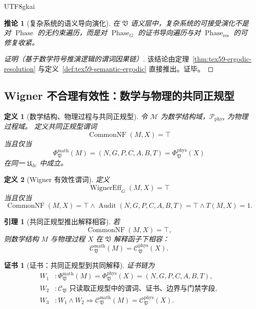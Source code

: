 \documentclass[12pt]{article}
\newtheorem{definition}{定义}[section]
\newtheorem{corollary}{推论}[section]
\newtheorem{lemma}{引理}[section]
\newtheorem{Certificate}{证书}[section]
\newcommand{\Udc}{\mathfrak{U}_{\mathrm{dc}}}
\newcommand{\Vsys}{\mathfrak V}
\DeclareMathOperator{\Audit}{Audit}
\DeclareMathOperator{\Phase}{Phase}
\DeclareMathOperator{\WignerEff}{WignerEff}
\DeclareMathOperator{\CommonNF}{CommonNF}
\begin{document}
\begin{CJK*}{UTF8}{gkai}
\begin{corollary}[复杂系统的语义导向演化]
\label{cor:tex59-semantic-directed-evolution}
在 \(\Vsys\) 语义层中，复杂系统的可接受演化不是对 \(\Phase\) 的无约束遍历，而是对
\(\Phase_G\) 的证书导向遍历与对 \(\Phase_{\mathrm{res}}\) 的可修复收紧。
\end{corollary}

\begin{proof}[证明（基于数学符号推演逻辑的谓词因果链）]
该结论由定理~\ref{thm:tex59-ergodic-resolution} 与定义~\ref{def:tex59-semantic-ergodic} 直接推出。证毕。
\end{proof}

\subsection{Wigner 不合理有效性：数学与物理的共同正规型}
\label{subsec:tex59-wigner-effectiveness}

\begin{definition}[数学结构、物理过程与共同正规型]
\label{def:tex59-wigner-common-nf}
令 \(\mathcal M\) 为数学结构域，\(\mathcal P_{\mathrm{phys}}\) 为物理过程域。
定义共同正规型谓词
\[
  \CommonNF(M,X)=\top
\]
当且仅当
\[
  \Phi_{\Vsys}^{\mathrm{math}}(M)
  =
  (N,G,P,C,A,B,T)
  =
  \Phi_{\Vsys}^{\mathrm{phys}}(X)
\]
在同一 \(\Udc\) 中成立。
\end{definition}

\begin{definition}[Wigner 有效性谓词]
\label{def:tex59-wigner-predicate}
定义
\[
  \WignerEff_G(M,X)=\top
\]
当且仅当
\[
  \CommonNF(M,X)=\top
  \wedge
  \Audit(N,G,P,C,A,B,T)=\top
  \wedge
  T(M,X)=1.
\]
\end{definition}

\begin{lemma}[共同正规型推出解释相容]
\label{lem:tex59-common-nf-interpretation}
若
\[
  \CommonNF(M,X)=\top,
\]
则数学结构 \(M\) 与物理过程 \(X\) 在 \(\Vsys\) 解释函子下相容：
\[
  \mathcal C_{\Vsys}^{\mathrm{math}}(M)
  =
  \mathcal C_{\Vsys}^{\mathrm{phys}}(X).
\]
\end{lemma}

\begin{Certificate}[证书：共同正规型到共同解释]
\label{cert:tex59-common-nf-interpretation}
证书链为
\[
\begin{aligned}
  W_1 &: \Phi_{\Vsys}^{\mathrm{math}}(M)
       =
       \Phi_{\Vsys}^{\mathrm{phys}}(X)
       =
       (N,G,P,C,A,B,T),\\
  W_2 &: \mathcal C_{\Vsys}
       \text{ 只读取正规型中的谓词、证书、边界与门禁字段},\\
  W_3 &: W_1\wedge W_2
       \Rightarrow
       \mathcal C_{\Vsys}^{\mathrm{math}}(M)
       =
       \mathcal C_{\Vsys}^{\mathrm{phys}}(X).
\end{aligned}
\]
\end{Certificate}


\end{CJK*}
\end{document}
